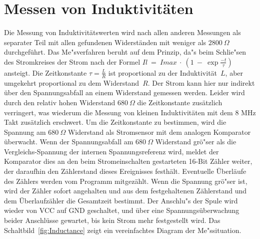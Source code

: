 \section{Messen von Induktivit\"aten}
Die Messung von Induktivit\"atswerten wird nach allen anderen Messungen als separater Teil mit allen
gefundenen Widerst\"anden mit weniger als \(2800~\Omega\) durchgef\"uhrt.
Das Me"sverfahren beruht auf dem Prinzip, da"s beim Schlie"sen des Stromkreises der Strom nach
der Formel \(Il~=~Imax~\cdot~(1~-~\exp{\frac{-t}{\tau}})\) ansteigt.
Die Zeitkonstante \(\tau = \frac{L}{R}\) ist proportional zu der Induktivit\"at~\(L\), aber umgekehrt
proportional zu dem Widerstand~\(R\). 
Der Strom kann hier nur indirekt \"uber den Spannungsabfall an einem Widerstand
gemessen werden.
Leider wird durch den relativ hohen Widerstand \(680~\Omega\) die Zeitkonstante zus\"atzlich verringert, was
wiederum die Messung von kleinen Induktivit\"aten mit dem 8 MHz Takt zus\"atzlich erschwert.
Um die Zeitkonstante zu bestimmen, wird die Spannung am \(680~\Omega\) Widerstand als Stromsensor
mit dem analogen Komparator \"uberwacht. Wenn der Spannungsabfall am \(680~\Omega\) Widerstand gr\"o"ser als
die Vergleichs-Spannung der internen Spannungsreferenz wird, meldet der Komparator dies an den beim
Stromeinschalten gestarteten 16-Bit Z\"ahler weiter, der daraufhin den Z\"ahlerstand dieses
Ereignisses festh\"alt. Eventuelle \"Uberl\"aufe des Z\"ahlers werden vom Programm mitgez\"ahlt. 
Wenn die Spannung gr\"o"ser ist, wird der Z\"ahler sofort angehalten und aus dem festgehaltenen Z\"ahlerstand und
dem \"Uberlaufz\"ahler die Gesamtzeit bestimmt.
Der Anschlu"s der Spule wird wieder von VCC auf GND geschaltet, und \"uber eine Spannungs\"uberwachung beider
Anschl\"usse gewartet, bis kein Strom mehr festgestellt wird.
Das Schaltbild~\ref{fig:Inductance} zeigt ein vereinfachtes Diagram der Me"ssituation.

